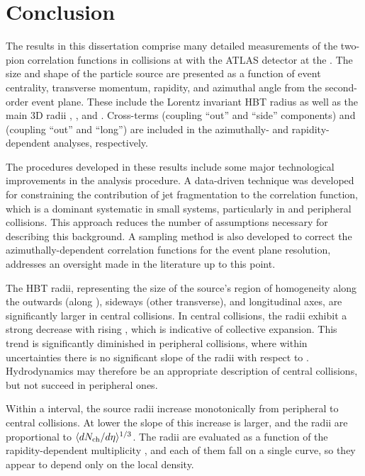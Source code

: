 \chapter{Conclusion}
\label{ch:conclusion}

The results in this dissertation comprise many detailed measurements of the two-pion correlation functions in \pPb collisions at \pPbenergy with the ATLAS detector at the \lhc.
The size and shape of the particle source are presented as a function of event centrality, transverse momentum, rapidity, and azimuthal angle from the second-order event plane.
These include the Lorentz invariant HBT radius \Rinv as well as the main 3D radii \Rout, \Rside, and \Rlong.
Cross-terms \Ros (coupling ``out'' and ``side'' components) and \Rol (coupling ``out'' and ``long'') are included in the azimuthally- and rapidity-dependent analyses, respectively.

The procedures developed in these results include some major technological improvements in the analysis procedure.
A data-driven technique was developed for constraining the contribution of jet fragmentation to the correlation function, which is a dominant systematic in small systems, particularly in \pp and peripheral \pA collisions.
This approach reduces the number of assumptions necessary for describing this background.
A sampling method is also developed to correct the azimuthally-dependent correlation functions for the event plane resolution, addresses an oversight made in the literature up to this point.

The HBT radii, representing the size of the source's region of homogeneity along the outwards (along \kt), sideways (other transverse), and longitudinal axes, are significantly larger in central collisions.
In central collisions, the radii exhibit a strong decrease with rising \kt, which is indicative of collective expansion.
This trend is significantly diminished in peripheral collisions, where within uncertainties there is no significant slope of the radii with respect to \kt.
Hydrodynamics may therefore be an appropriate description of central \pPb collisions, but not succeed in peripheral ones.

Within a \kt interval, the source radii increase monotonically from peripheral to central collisions.
At lower \kt the slope of this increase is larger, and the radii are proportional to \(\langle d\mbox{$N_{\mathrm{ch}}$}/d\eta\rangle^{1/3}\).
The radii are evaluated as a function of the rapidity-dependent multiplicity \dNdy, and each of them fall on a single curve, so they appear to depend only on the local density.

